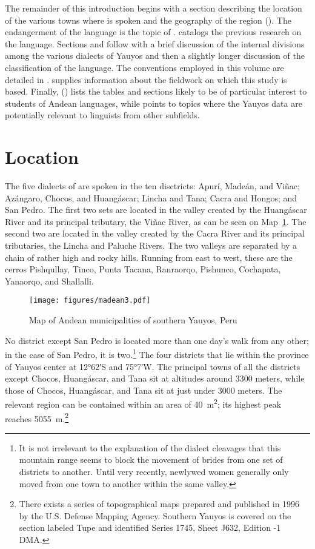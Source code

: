 The remainder of this introduction begins with a section describing the location of the various towns where \SYQ{} is spoken and the geography of the region (). The endangerment of the language is the topic of .  catalogs the previous research on the language. Sections  and  follow with a brief discussion of the internal divisions among the various dialects of Yauyos and then a slightly longer discussion of the classification of the language. The conventions employed in this volume are detailed in .  supplies information about the fieldwork on which this study is based. Finally, () lists the tables and sections likely to be of particular interest to students of Andean languages, while  points to topics where the Yauyos data are potentially relevant to linguists from other subfields. 

\section{Location}\label{sec:locationofyauyos}
\largerpage
The five dialects of \SYQ{} are spoken in the ten disctricts: Apurí, Madeán, and Viñac; Azángaro, Chocos, and Huangáscar; Lincha and Tana; Cacra and Hongos; and San Pedro. The first two sets are located in the valley created by the Huangáscar River and its principal tributary, the Viñac River, as can be seen on Map~\ref{fig:madeandistrict}. The second two are located in the valley created by the Cacra River and its principal tributaries, the Lincha and Paluche Rivers. The two valleys are separated by a chain of rather high and rocky hills. Running from east to west, these are the cerros Pishqullay, Tinco, Punta Tacana, Ranraorqo, Pishunco, Cochapata, Yanaorqo, and Shallalli. 


\begin{figure}
 \caption{Map of Andean municipalities of southern Yauyos, Peru}
\label{fig:madeandistrict}
\texttt{[image: figures/madean3.pdf]}
\end{figure}

No district except San Pedro is located more than one day’s walk from any other; in the case of San Pedro, it is two.\footnote{It is not irrelevant to the explanation of the dialect cleavages that this mountain range seems to block the movement of brides from one set of districts to another. Until very recently, newlywed women generally only moved from one town to another within the same valley.} The four districts that lie within the province of Yauyos center at 12°62′S and 75°7′W. The principal towns of all the districts except Chocos, Huangáscar, and Tana sit at altitudes around 3300 meters, while those of Chocos, Huangáscar, and Tana sit at just under 3000 meters. The relevant region can be contained within an area of 40~m\textsuperscript{2}; its highest peak reaches 5055~m.\footnote{There exists a series of topographical maps prepared and published in 1996 by the U.S. Defense Mapping Agency. Southern Yauyos is covered on the section labeled Tupe and identified Series 1745, Sheet J632, Edition -1 DMA.}

